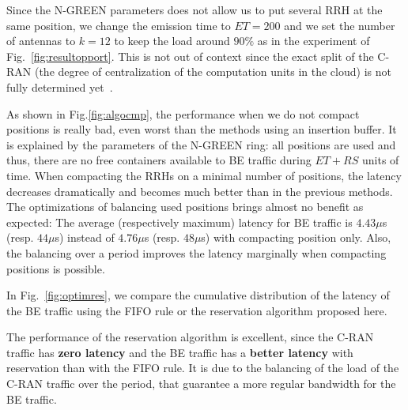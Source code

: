 \documentclass[10pt, conference, letterpaper]{IEEEtran}
\begin{document}
 Since the N-GREEN parameters does not allow us to put several RRH at the same position, we change the emission time to $ET = 200$ and we set the number of antennas to $k = 12$ to keep the load around $90\%$ as in the experiment of Fig.~\ref{fig:resultopport}. This is not out of context since the exact split of the C-RAN (the degree of centralization of the computation units in the cloud) is not fully determined yet~\cite{mobile2011c}. %

As shown in Fig.\ref{fig:algocmp}, the performance when we do not compact positions is really bad, even worst than the methods using an insertion buffer. It is explained by the parameters of the N-GREEN ring: all positions are used and thus, there are no free containers available to BE traffic during $ET+RS$ units of time. When compacting the RRHs on a minimal number of positions, the latency decreases dramatically and becomes much better than in the previous methods. The optimizations of balancing used positions brings almost no benefit as expected: The average (respectively maximum) latency for BE traffic is $4.43\mu$s (resp. $44\mu$s) instead of $4.76\mu$s (resp. $48\mu$s) with compacting position only. Also, the balancing over a period improves the latency marginally when compacting positions is possible. 


In Fig.~\ref{fig:optimres}, we compare the cumulative distribution of the latency of the BE traffic using the FIFO rule or the reservation algorithm proposed here. 

  The performance of the reservation algorithm is excellent, since the C-RAN traffic has {\bf zero latency} and the BE traffic has a \textbf{better latency} with reservation than with the FIFO rule. It is due to the balancing of the load of the C-RAN traffic over the period, that guarantee a more regular bandwidth for the BE traffic.
  
\end{document}
